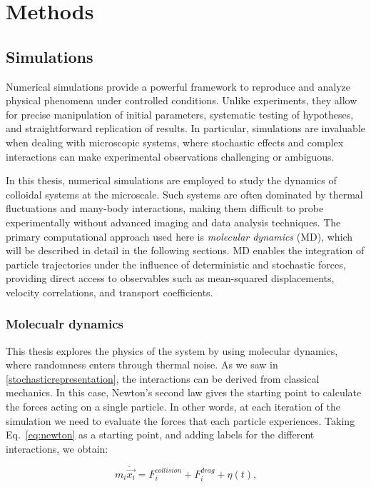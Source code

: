 \part{Methods}

\chapter{Simulations}

Numerical simulations provide a powerful framework to reproduce and analyze physical phenomena under controlled conditions. Unlike experiments, they allow for precise manipulation of initial parameters, systematic testing of hypotheses, and straightforward replication of results. In particular, simulations are invaluable when dealing with microscopic systems, where stochastic effects and complex interactions can make experimental observations challenging or ambiguous. 

In this thesis, numerical simulations are employed to study the dynamics of colloidal systems at the microscale. Such systems are often dominated by thermal fluctuations and many-body interactions, making them difficult to probe experimentally without advanced imaging and data analysis techniques. The primary computational approach used here is \textit{molecular dynamics} (MD), which will be described in detail in the following sections. MD enables the integration of particle trajectories under the influence of deterministic and stochastic forces, providing direct access to observables such as mean-squared displacements, velocity correlations, and transport coefficients.

\section{Molecualr dynamics}

This thesis explores the physics of the system by using molecular dynamics, where randomness enters through thermal noise. As we saw in \ref{stochasticrepresentation}, the interactions can be derived from classical mechanics. In this case, Newton’s second law gives the starting point to calculate the forces acting on a single particle. In other words, at each iteration of the simulation we need to evaluate the forces that each particle experiences. Taking Eq.~\ref{eq:newton} as a starting point, and adding labels for the different interactions, we obtain:

\begin{equation}
  m_i\ddot{\vec{x_i}} = F^{collision}_i + F^{drag}_i + \eta(t)\text{,}
  \label{eq:langevinratchet}
\end{equation}

